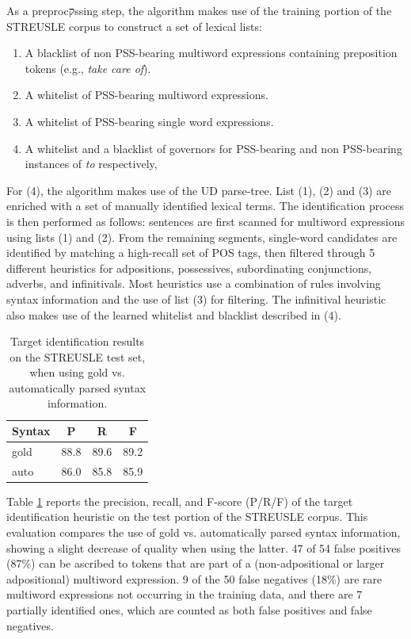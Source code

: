 As a preprocקssing step, the algorithm makes use of the training portion of the STREUSLE corpus to construct a set of lexical lists:
\begin{enumerate}
    \item A blacklist of non PSS-bearing multiword expressions containing preposition tokens (e.g., \emph{take care of}).
    \item A whitelist of PSS-bearing multiword expressions.
    \item A whitelist of PSS-bearing single word expressions.
    \item A whitelist and a blacklist of governors for PSS-bearing and non PSS-bearing instances of \emph{to} respectively, 
\end{enumerate}

For (4), the algorithm makes use of the UD parse-tree. List (1), (2) and (3) are enriched with a set of manually identified lexical terms. The identification process is then performed as follows: sentences are first scanned for multiword expressions using lists (1) and (2). From the remaining segments, single-word candidates are identified by matching a high-recall set of POS tags,
then filtered through 5 different heuristics for adpositions, possessives, subordinating conjunctions,
adverbs, and infinitivals. Most heuristics use a combination of rules involving syntax information and the use of list (3) for filtering. The infinitival heuristic also makes use of the learned whitelist and blacklist described in (4).

\begin{table}[t]\centering\small
\begin{tabular}{lccc}
Syntax & P & R & F \\
\toprule
gold & 88.8 & 89.6 & 89.2 \\
auto & 86.0 & 85.8 & 85.9 \\
\end{tabular}
\caption{Target identification results on the STREUSLE test set, when using gold vs. automatically parsed syntax information.}
\label{tab:targetid}
\end{table}

Table \ref{tab:targetid}
reports the precision, recall, and F-score (P/R/F) of
the target identification heuristic on the test portion of the STREUSLE corpus. This evaluation compares the use of gold vs. automatically parsed syntax information, showing a slight decrease of quality when using the latter. 47 of 54 false positives (87\%) can be ascribed to tokens that are part of a (non-adpositional or larger adpositional) multiword expression. 9 of the 50 false negatives (18\%) are rare multiword expressions not
occurring in the training data, and there are 7 partially identified ones, which are counted as both
false positives and false negatives.

